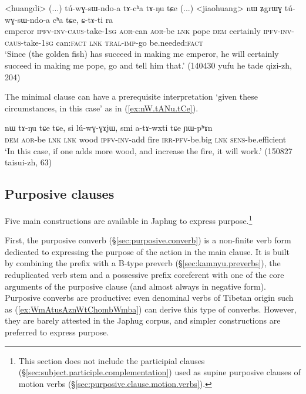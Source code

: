 \begin{exe}
\ex \label{ex:tAcha.tANu}
\gll <huangdi> (...) tú-wɣ-sɯ-ndo-a tɤ-cʰa tɤ-ŋu tɕe (...) <jiaohuang> nɯ ʑgrɯɣ tú-wɣ-sɯ-ndo-a cʰa tɕe, ɕ-tɤ-ti ra \\
emperor {  } \textsc{ipfv}-\textsc{inv}-\textsc{caus}-take-\textsc{1sg} \textsc{aor}-can \textsc{aor}-be \textsc{lnk} {  } pope \textsc{dem} certainly \textsc{ipfv}-\textsc{inv}-\textsc{caus}-take-\textsc{1sg} can:\textsc{fact} \textsc{lnk} \textsc{tral}-\textsc{imp}-go be.needed:\textsc{fact} \\
\glt `Since (the golden fish) has succeed in making me emperor, he will certainly succeed in making me pope, go and tell him that.' (140430 yufu he tade qizi-zh, 204)
\end{exe}

The minimal clause  can have a prerequisite interpretation `given these circumstances, in this case' as in (\ref{ex:nW.tANu.tCe}).

\begin{exe}
\ex \label{ex:nW.tANu.tCe}
\gll nɯ tɤ-ŋu tɕe tɕe, si lú-wɣ-ɣɤjɯ, smi a-tɤ-wxti tɕe ɲɯ-pʰɤn \\
\textsc{dem} \textsc{aor}-be \textsc{lnk} \textsc{lnk} wood \textsc{ipfv}-\textsc{inv}-add fire \textsc{irr}-\textsc{pfv}-be.big \textsc{lnk} \textsc{sens}-be.efficient \\
\glt `In this case, if one adds more wood, and increase the fire, it will work.' (150827 taisui-zh, 63)
\end{exe}


 \subsection{Purposive clauses} \label{sec:purposive.clauses}
 Five main constructions are available in Japhug to express purpose.\footnote{This section does not include the  participial clauses (§\ref{sec:subject.participle.complementation}) used as supine purposive clauses of motion verbs  (§\ref{sec:purposive.clause.motion.verbs}).
 }

First, the purposive converb (§\ref{sec:purposive.converb}) is a non-finite verb form dedicated to expressing the purpose of the action in the main clause. It is built by combining the prefix  with a B-type preverb (§\ref{sec:kamnyu.preverbs}), the reduplicated verb stem and a possessive prefix coreferent with one of the core arguments of the purposive clause (and almost always in negative form). Purposive converbs are productive: even denominal verbs of Tibetan origin such as    (\ref{ex:WmAtusAznWtChombWmba}) can derive this type of converbs. However, they are barely attested in the Japhug corpus, and simpler constructions are preferred to express purpose.


